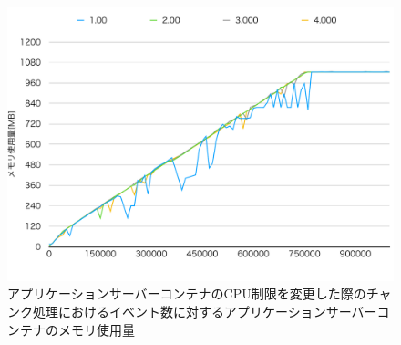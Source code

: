 \documentclass[../../../../../main]{subfiles}
\begin{document}
    \begin{figure}[H]
        \centering
        \includegraphics[width=12cm]{graph}
        \caption{アプリケーションサーバーコンテナのCPU制限を変更した際のチャンク処理におけるイベント数に対するアプリケーションサーバーコンテナのメモリ使用量}
        \label{fig:stream-change-app-cpu-limit-app-memory-app_1024-db_1_1024}
    \end{figure}
\end{document}
